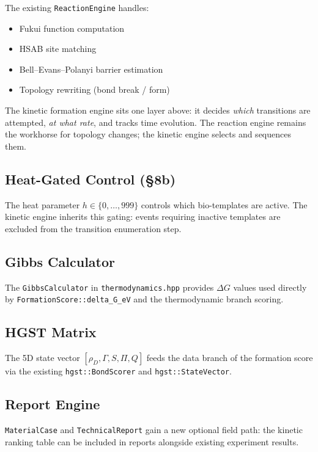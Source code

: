 \documentclass[11pt]{article}
\begin{document}
The existing \texttt{ReactionEngine} handles:
\begin{itemize}[leftmargin=2em]
  \item Fukui function computation
  \item HSAB site matching
  \item Bell--Evans--Polanyi barrier estimation
  \item Topology rewriting (bond break / form)
\end{itemize}

The kinetic formation engine sits one layer above:
it decides \emph{which} transitions are attempted, \emph{at what rate},
and tracks time evolution.  The reaction engine remains the workhorse for
topology changes; the kinetic engine selects and sequences them.

\subsection{Heat-Gated Control (\S8b)}

The heat parameter $h \in \{0,\ldots,999\}$ controls which
bio-templates are active.  The kinetic engine inherits this gating:
events requiring inactive templates are excluded from the transition
enumeration step.

\subsection{Gibbs Calculator}

The \texttt{GibbsCalculator} in \texttt{thermodynamics.hpp} provides
$\Delta G$ values used directly by
\texttt{FormationScore::delta\_G\_eV}
and the thermodynamic branch scoring.

\subsection{HGST Matrix}

The 5D state vector $[\rho_D, \Gamma, S, \Pi, Q]$ feeds the
data branch of the formation score via the existing
\texttt{hgst::BondScorer} and \texttt{hgst::StateVector}.

\subsection{Report Engine}

\texttt{MaterialCase} and \texttt{TechnicalReport} gain a new optional
field path: the kinetic ranking table can be included in reports
alongside existing experiment results.
\end{document}
